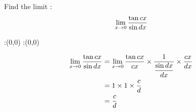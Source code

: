 


\newcommand{\ltzero}{\lim_{x \to 0}}
\question Find the limit : 
\begin{align}
\ltzero \dfrac{\tan \vbone x}{\sin \vbtwo x} \notag
\end{align}


\watchout

\ifprintanswers
  \begin{marginfigure}
      :(0,0)
      :(0,0)
    \figdrawbegin{}
      \figdrawline [100,101]
    \figdrawend
    \figvisu{\figBoxA}{}{%
    }
    \centerline{\box\figBoxA}
  \end{marginfigure}
\fi 

\begin{solution}
\begin{align}
\ltzero \dfrac{\tan \vbone x}{\sin \vbtwo x} &= \ltzero \dfrac{\tan \vbone x}{\vbone x} \times \dfrac{1}{\dfrac{\sin \vbtwo x}{\vbtwo x}} \times \dfrac{\vbone x}{\vbtwo x} \\
&= 1 \times 1 \times \dfrac{\vbone}{\vbtwo} \\
&= \dfrac{\vbone}{\vbtwo}
\end{align}
\end{solution}

